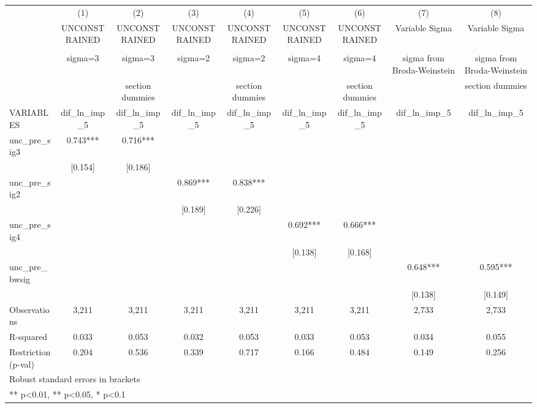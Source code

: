 \begin{adjustbox}{max width=\textwidth}
\begin{tabular}{lcccccccc}
\toprule
 & (1) & (2) & (3) & (4) & (5) & (6) & (7) & (8) \\
 & UNCONSTRAINED & UNCONSTRAINED & UNCONSTRAINED & UNCONSTRAINED & UNCONSTRAINED & UNCONSTRAINED & Variable Sigma & Variable Sigma \\
 &  &  &  &  &  &  &  &  \\
 & sigma=3 & sigma=3 & sigma=2 & sigma=2 & sigma=4 & sigma=4 & sigma from Broda-Weinstein & sigma from Broda-Weinstein \\
 &  & section dummies &  & section dummies &  & section dummies &  & section dummies \\
VARIABLES & dif\_ln\_imp\_5 & dif\_ln\_imp\_5 & dif\_ln\_imp\_5 & dif\_ln\_imp\_5 & dif\_ln\_imp\_5 & dif\_ln\_imp\_5 & dif\_ln\_imp\_5 & dif\_ln\_imp\_5 \\
\midrule
unc\_pre\_sig3 & 0.743*** & 0.716*** &  &  &  &  &  &  \\
 & [0.154] & [0.186] &  &  &  &  &  &  \\
unc\_pre\_sig2 &  &  & 0.869*** & 0.838*** &  &  &  &  \\
 &  &  & [0.189] & [0.226] &  &  &  &  \\
unc\_pre\_sig4 &  &  &  &  & 0.692*** & 0.666*** &  &  \\
 &  &  &  &  & [0.138] & [0.168] &  &  \\
unc\_pre\_bwsig &  &  &  &  &  &  & 0.648*** & 0.595*** \\
 &  &  &  &  &  &  & [0.138] & [0.149] \\
\midrule
Observations & 3,211 & 3,211 & 3,211 & 3,211 & 3,211 & 3,211 & 2,733 & 2,733 \\
R-squared & 0.033 & 0.053 & 0.032 & 0.053 & 0.033 & 0.053 & 0.034 & 0.055 \\
Restriction (p-val) & 0.204 & 0.536 & 0.339 & 0.717 & 0.166 & 0.484 & 0.149 & 0.256 \\
\bottomrule
\multicolumn{9}{l}{\footnotesize Robust standard errors in brackets} \\
\multicolumn{9}{l}{\footnotesize *** p<0.01, ** p<0.05, * p<0.1} \\
\end{tabular}
\end{adjustbox}
